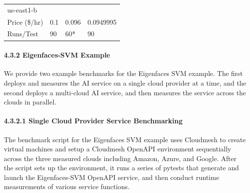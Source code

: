 \begin{tabular}[]{@{}llll@{}}
\begin{minipage}[t]{0.12\columnwidth}
us-east1-b\strut
\end{minipage}\tabularnewline
\begin{minipage}[t]{0.13\columnwidth}\raggedright
Price (\$/hr)\strut
\end{minipage} & \begin{minipage}[t]{0.17\columnwidth}\raggedright
0.1\strut
\end{minipage} & \begin{minipage}[t]{0.47\columnwidth}\raggedright
0.096\strut
\end{minipage} & \begin{minipage}[t]{0.12\columnwidth}\raggedright
0.0949995\strut
\end{minipage}\tabularnewline
\begin{minipage}[t]{0.13\columnwidth}\raggedright
Runs/Test\strut
\end{minipage} & \begin{minipage}[t]{0.17\columnwidth}\raggedright
90\strut
\end{minipage} & \begin{minipage}[t]{0.47\columnwidth}\raggedright
60*\strut
\end{minipage} & \begin{minipage}[t]{0.12\columnwidth}\raggedright
90\strut
\end{minipage}\tabularnewline
\bottomrule
\end{tabular}

\hypertarget{eigenfaces-svm-example}{%
\paragraph{4.3.2 Eigenfaces-SVM Example}\label{eigenfaces-svm-example}}

We provide two example benchmarks for the Eigenfaces SVM example. The
first deploys and measures the AI service on a single cloud provider at
a time, and the second deploys a multi-cloud AI service, and then
measures the service across the clouds in parallel.

\hypertarget{single-cloud-provider-service-benchmarking}{%
\paragraph{4.3.2.1 Single Cloud Provider Service
Benchmarking}\label{single-cloud-provider-service-benchmarking}}

The benchmark script for the Eigenfaces SVM example uses Cloudmesh to
create virtual machines and setup a Cloudmesh OpenAPI environment
sequentially across the three measured clouds including Amazon, Azure,
and Google. After the script sets up the environment, it runs a series
of pytests that generate and launch the Eigenfaces-SVM OpenAPI service,
and then conduct runtime measurements of various service functions.

